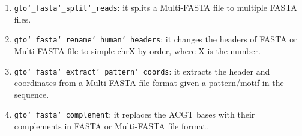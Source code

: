 \begin{enumerate}
\item \texttt{gto\char`_fasta\char`_split\char`_reads}: it splits a Multi-FASTA file to multiple FASTA files.

\item \texttt{gto\char`_fasta\char`_rename\char`_human\char`_headers}: it changes the headers of FASTA or Multi-FASTA file to simple chrX by order, where X is the number.

\item \texttt{gto\char`_fasta\char`_extract\char`_pattern\char`_coords}: it extracts the header and coordinates from a Multi-FASTA file format given a pattern/motif in the sequence.

\item \texttt{gto\char`_fasta\char`_complement}: it replaces the ACGT bases with their complements in FASTA or Multi-FASTA file format.


\end{enumerate}





 








%